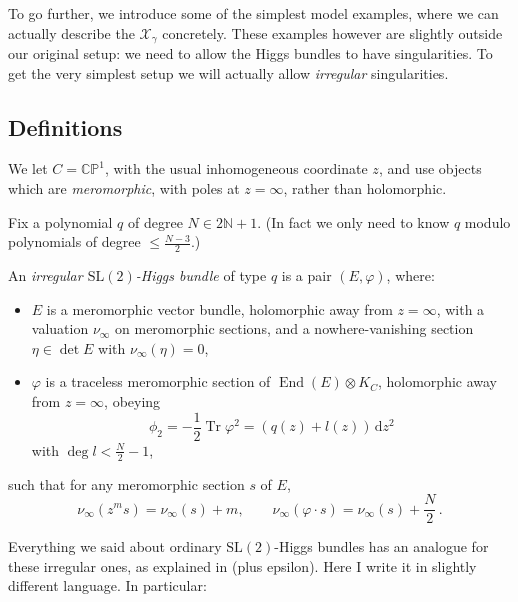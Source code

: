 \documentclass[12pt,letterpaper,reqno]{article}
\numberwithin{equation}{section}
\begin{document}
To go further, we introduce some of the simplest model examples,
where we can actually describe the $\mathcal X_\gamma$ concretely. These examples
however are slightly outside our original setup: we need to allow
the Higgs bundles to have singularities. To get the very simplest
setup we will actually allow \textit{irregular} singularities.


\subsection{Definitions}

We let $C = \mathbb C\mathbb P^1$, with the usual inhomogeneous coordinate $z$, 
and use objects which are \textit{meromorphic},
with poles at $z = \infty$, rather than holomorphic.

Fix a polynomial $q$ of degree $N \in 2 \mathbb N + 1$.
(In fact we only need to know $q$ modulo polynomials of degree
$\le \frac{N-3}{2}$.)

\begin{defn}
An \textit{irregular $\mathrm{SL}(2)$-Higgs bundle} of type $q$ is
a pair $(E,\varphi)$, where:
\begin{itemize} 
  \item $E$ is a 
meromorphic vector bundle, holomorphic away from 
$z = \infty$, 
with a valuation $\nu_\infty$ on meromorphic sections,
and a nowhere-vanishing section $\eta \in \det E$ with $\nu_\infty(\eta) = 0$,
 \item $\varphi$ is a traceless meromorphic section of $\operatorname{End}(E) \otimes K_C$,
 holomorphic away from $z = \infty$, obeying 
\begin{equation} \label{eq:phi2-polynomial}
  \phi_2 = -\frac12 \operatorname{Tr} \varphi^2 = (q(z) + l(z)) \, \mathrm{d} z^2
\end{equation}
with $\deg l < \frac{N}{2} - 1$,
\end{itemize}
such that for any meromorphic section $s$ of $E$, 
\begin{equation}
\nu_\infty(z^{m} s) = \nu_\infty(s) + m, \qquad \nu_\infty(\varphi \cdot s) = \nu_\infty(s) + \frac{N}{2} \, .  
\end{equation}
\end{defn}

Everything we said about ordinary $\mathrm{SL}(2)$-Higgs bundles
has an analogue for these irregular ones, as explained in \cite{wnh} (plus epsilon).
Here I write it in slightly different language.
In particular:
\end{document}
